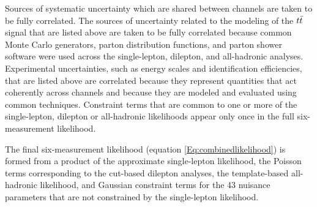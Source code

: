 Sources of systematic uncertainty which are shared between channels are taken to be fully correlated.
The sources of uncertainty related to the modeling of the $t\bar{t}$ signal that are listed above are taken to be fully correlated because common Monte Carlo generators, parton distribution functions, and parton shower software were used across the single-lepton, dilepton, and all-hadronic analyses.
Experimental uncertainties, such as energy scales and identification efficiencies, that are listed above are correlated because they represent quantities that act coherently across channels and because they are modeled and evaluated using common techniques.
Constraint terms that are common to one or more of the single-lepton, dilepton or all-hadronic likelihoods appear only once in the full six-measurement likelihood.

The final six-measurement likelihood (equation \ref{Eq:combinedlikelihood}) is formed from a product of the approximate single-lepton likelihood, the Poisson terms corresponding to the cut-based dilepton analyses, the template-based all-hadronic likelihood, and Gaussian constraint terms for the 43 nuisance parameters that are not constrained by the single-lepton likelihood.

